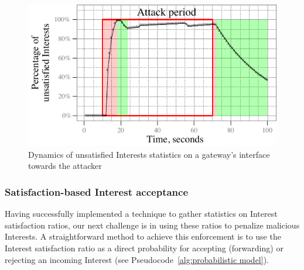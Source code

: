 \documentclass[10pt,conference]{IEEEtran}
\begin{document}
\begin{figure}[t]
  \centering
  \includegraphics[scale=0.8]{limits}
  \caption{Dynamics of  unsatisfied Interests statistics on a gateway's interface towards the attacker}
  \label{fig:ratio example}
\end{figure}


\subsubsection{\textbf{Satisfaction-based Interest acceptance}}
\label{sec:probabilistic}

Having successfully implemented a technique to gather statistics on Interest satisfaction ratios, our next challenge is in using these ratios to penalize malicious Interests. A straightforward method to achieve this enforcement is to use the Interest satisfaction ratio as a direct probability for accepting (forwarding) or rejecting an incoming Interest (see Pseudocode~\ref{alg:probabilistic model}).



\end{document}

